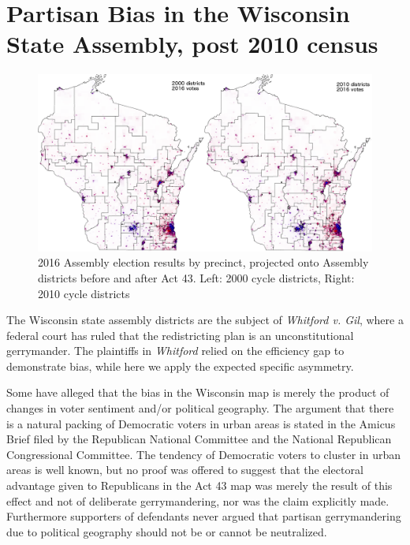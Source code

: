 \documentclass[preprint,12pt]{article}
\begin{document}
\section{Partisan Bias in the Wisconsin State Assembly, post 2010 census\label{sec:Wis}}

\begin{figure}[htb!]
    \begin{center}
        \includegraphics[scale=0.35]{../Figures/WI_compared/precincts_pop_combined.png}
        \caption{2016 Assembly election results by precinct, projected onto Assembly districts before and after Act 43. Left: 2000 cycle districts, Right: 2010 cycle districts}\label{fig:MapsWI}
    \end{center}
\end{figure}

The Wisconsin state assembly districts are the subject of \emph{Whitford v. Gil}, where a federal court has ruled that the redistricting plan is an unconstitutional gerrymander.
The plaintiffs in \emph{Whitford} relied on the efficiency gap to demonstrate bias, while here we apply the expected specific asymmetry.

Some have alleged that the bias in the Wisconsin map is merely the product of changes in voter sentiment and/or political geography.
The argument that there is a natural packing of Democratic voters in urban areas is stated in the Amicus Brief filed by the Republican National Committee and the National Republican Congressional Committee.
The tendency of Democratic voters to cluster in urban areas is well known, but no proof was offered to suggest that the electoral advantage given to Republicans in the Act 43 map was merely the result of this effect and not of deliberate gerrymandering, nor was the claim explicitly made.
Furthermore supporters of defendants never argued that partisan gerrymandering due to political geography should not be or cannot be neutralized.
\end{document}
